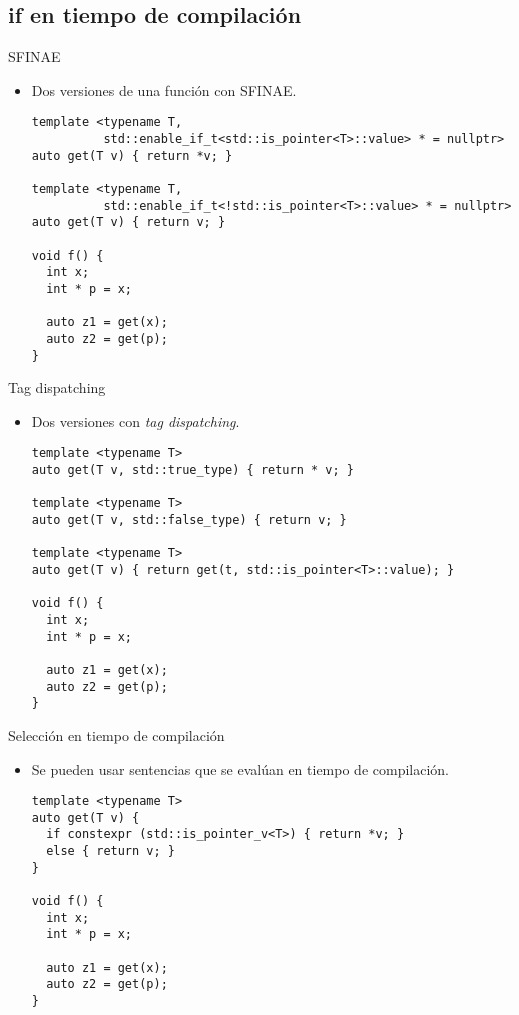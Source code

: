 \subsection{{\bf if} en tiempo de compilación}

\begin{frame}[t,fragile]{SFINAE}
\begin{itemize}
  \item Dos versiones de una función con SFINAE.
\begin{lstlisting}
template <typename T,
          std::enable_if_t<std::is_pointer<T>::value> * = nullptr>
auto get(T v) { return *v; }

template <typename T,
          std::enable_if_t<!std::is_pointer<T>::value> * = nullptr>
auto get(T v) { return v; }

void f() {
  int x;
  int * p = x;

  auto z1 = get(x);
  auto z2 = get(p);
}
\end{lstlisting}
\end{itemize}
\end{frame}

\begin{frame}[t,fragile]{Tag dispatching}
\begin{itemize}
  \item Dos versiones con \emph{tag dispatching}.
\begin{lstlisting}
template <typename T>
auto get(T v, std::true_type) { return * v; }

template <typename T>
auto get(T v, std::false_type) { return v; }

template <typename T>
auto get(T v) { return get(t, std::is_pointer<T>::value); }

void f() {
  int x;
  int * p = x;

  auto z1 = get(x);
  auto z2 = get(p);
}
\end{lstlisting}
\end{itemize}
\end{frame}

\begin{frame}[t,fragile]{Selección en tiempo de compilación}
\begin{itemize}
  \item Se pueden usar sentencias  que se evalúan en tiempo de compilación.
\begin{lstlisting}
template <typename T>
auto get(T v) { 
  if constexpr (std::is_pointer_v<T>) { return *v; }
  else { return v; }
}

void f() {
  int x;
  int * p = x;

  auto z1 = get(x);
  auto z2 = get(p);
}
\end{lstlisting}
\end{itemize}
\end{frame}
